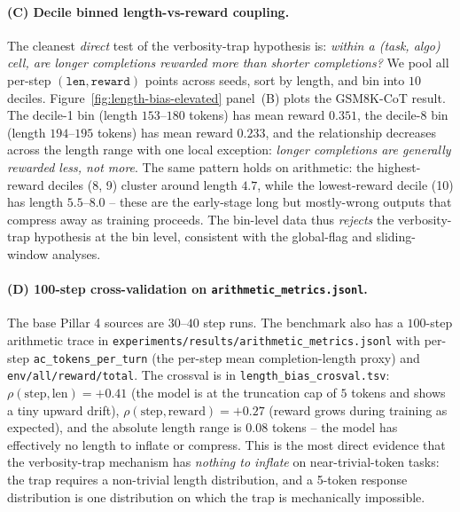 \paragraph{(C) Decile binned length-vs-reward coupling.}
The cleanest \emph{direct} test of the verbosity-trap hypothesis
is: \emph{within a (task, algo) cell, are longer completions
rewarded more than shorter completions?} We pool all
per-step $(\texttt{len}, \texttt{reward})$ points across seeds,
sort by length, and bin into $10$ deciles. Figure~\ref{fig:length-bias-elevated}
panel~(B) plots the GSM8K-CoT result. The decile-1 bin
(length $153$--$180$ tokens) has mean reward $0.351$, the
decile-8 bin (length $194$--$195$ tokens) has mean reward
$0.233$, and the relationship decreases across the length range with
one local exception: \emph{longer
completions are generally rewarded \emph{less}, not more}. The same
pattern holds on arithmetic: the highest-reward deciles (8, 9)
cluster around length $4.7$, while the lowest-reward decile
(10) has length $5.5$--$8.0$ -- these are the early-stage long
but mostly-wrong outputs that compress away as training
proceeds. The bin-level data thus \emph{rejects} the
verbosity-trap hypothesis at the bin level, consistent with the
global-flag and sliding-window analyses.

\paragraph{(D) 100-step cross-validation on \texttt{arithmetic\_metrics.jsonl}.}
The base Pillar 4 sources are $30$--$40$ step runs. The benchmark
also has a $100$-step arithmetic trace in
\texttt{experiments/results/arithmetic\_metrics.jsonl} with
per-step \texttt{ac\_tokens\_per\_turn} (the per-step mean
completion-length proxy) and \texttt{env/all/reward/total}.
The crossval is in \texttt{length\_bias\_crosval.tsv}:
$\rho(\text{step}, \text{len})=+0.41$ (the model is at the
truncation cap of $5$ tokens and shows a tiny upward drift),
$\rho(\text{step}, \text{reward})=+0.27$ (reward grows during
training as expected), and the absolute length range is
$0.08$ tokens -- the model has effectively no length to inflate
or compress. This is the most direct evidence that the
verbosity-trap mechanism has \emph{nothing to inflate} on
near-trivial-token tasks: the trap requires a non-trivial length
distribution, and a 5-token response distribution is one
distribution on which the trap is mechanically impossible.

